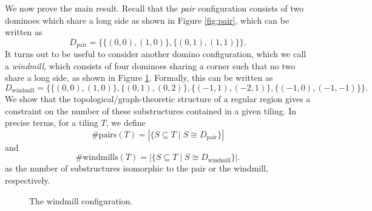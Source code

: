 We now prove the main result.
Recall that the \emph{pair} configuration consists of two dominoes which share a long side as shown in Figure \ref{fig:pair}, which can be written as
\begin{equation}
  D_\mathrm{pair} = \Big\{\{(0, 0), (1, 0)\}, \{(0, 1), (1, 1)\}\Big\}. 
\end{equation}
It turns out to be useful to consider another domino configuration, which we call a \emph{windmill}, which consists of four dominoes sharing a corner such that no two share a long side, as shown in Figure \ref{fig:windmill}. Formally, this can be written as
\begin{equation}
  D_{\mathrm{windmill}} = \Big\{\{(0, 0), (1, 0)\}, \{(0, 1), (0, 2)\}, \{(-1, 1), (-2, 1)\}, \{(-1, 0), (-1, -1)\} \Big\}.
\end{equation}
\noindent We show that the topological/graph-theoretic structure of a regular region gives a constraint on the number of these substructures contained in a given tiling. In precise terms, for a tiling $T$, we define
\begin{equation}
  \# \mathrm{pairs} (T) = |\{ S \subseteq T \mid S \cong D_{\mathrm{pair}}\}|
\end{equation}
and 
\begin{equation}
  \# \mathrm{windmills} (T) = |\{ S \subseteq T \mid S \cong D_{\mathrm{windmill}}\}|. 
\end{equation}
as the number of substructures isomorphic to the pair or the windmill, respectively.
\begin{figure}[h]
  \centering
  \begin{minipage}{0.45\textwidth}
    \centering
    \caption{The pair configuration.}\label{fig:pair}
  \end{minipage}
  \hfill
  \begin{minipage}{0.45\textwidth}
    \centering
    \caption{The windmill configuration.}\label{fig:windmill}
  \end{minipage}
\end{figure}

